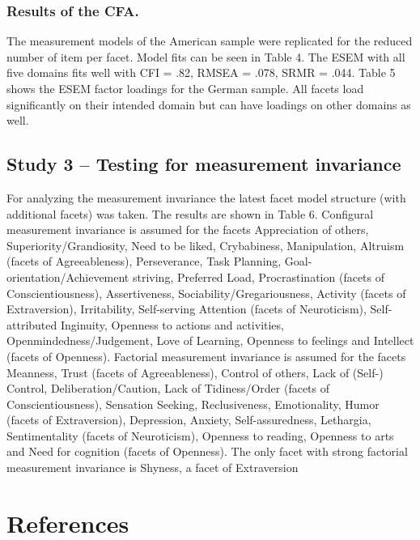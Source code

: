 \documentclass[,man]{apa6}
\theoremstyle{definition}
\theoremstyle{definition}
\theoremstyle{definition}
\theoremstyle{remark}
\begin{document}
\hypertarget{results-of-the-cfa.}{%
\subsubsection{Results of the CFA.}\label{results-of-the-cfa.}}

The measurement models of the American sample were replicated for the
reduced number of item per facet. Model fits can be seen in Table 4. The
ESEM with all five domains fits well with CFI = .82, RMSEA = .078, SRMR
= .044. Table 5 shows the ESEM factor loadings for the German sample.
All facets load significantly on their intended domain but can have
loadings on other domains as well.

\hypertarget{study-3-testing-for-measurement-invariance}{%
\subsection{Study 3 -- Testing for measurement
invariance}\label{study-3-testing-for-measurement-invariance}}

For analyzing the measurement invariance the latest facet model
structure (with additional facets) was taken. The results are shown in
Table 6. Configural measurement invariance is assumed for the facets
Appreciation of others, Superiority/Grandiosity, Need to be liked,
Crybabiness, Manipulation, Altruism (facets of Agreeableness),
Perseverance, Task Planning, Goal-orientation/Achievement striving,
Preferred Load, Procrastination (facets of Conscientiousness),
Assertiveness, Sociability/Gregariousness, Activity (facets of
Extraversion), Irritability, Self-serving Attention (facets of
Neuroticism), Self-attributed Inginuity, Openness to actions and
activities, Openmindedness/Judgement, Love of Learning, Openness to
feelings and Intellect (facets of Openness). Factorial measurement
invariance is assumed for the facets Meanness, Trust (facets of
Agreeableness), Control of others, Lack of (Self-) Control,
Deliberation/Caution, Lack of Tidiness/Order (facets of
Conscientiousness), Sensation Seeking, Reclusiveness, Emotionality,
Humor (facets of Extraversion), Depression, Anxiety, Self-assuredness,
Lethargia, Sentimentality (facets of Neuroticism), Openness to reading,
Openness to arts and Need for cognition (facets of Openness). The only
facet with strong factorial measurement invariance is Shyness, a facet
of Extraversion

\newpage

\hypertarget{references}{%
\section{References}\label{references}}
\end{document}
